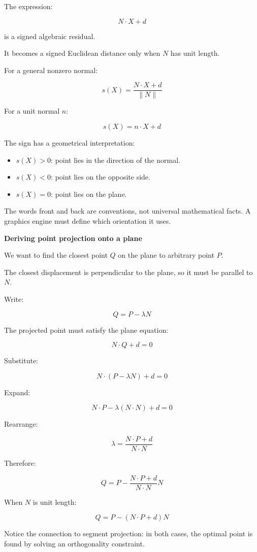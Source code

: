 The expression:

\[
N\cdot X+d
\]

is a signed algebraic residual.

It becomes a signed Euclidean distance only when \(N\) has unit length.

For a general nonzero normal:

\[
\boxed{ s(X)=\frac{N\cdot X+d}{\|N\|} }
\]

For a unit normal \(n\):

\[
\boxed{s(X)=n\cdot X+d}
\]

The sign has a geometrical interpretation:

\begin{itemize}
\tightlist
\item
  \(s(X)>0\): point lies in the direction of the normal.
\item
  \(s(X)<0\): point lies on the opposite side.
\item
  \(s(X)=0\): point lies on the plane.
\end{itemize}

The words front and back are conventions, not universal mathematical facts. A graphics engine must define which orientation it uses.

\textbf{Deriving point projection onto a plane}

We want to find the closest point \(Q\) on the plane to arbitrary point \(P\).

The closest displacement is perpendicular to the plane, so it must be parallel to \(N\).

Write:

\[
Q=P-\lambda N
\]

The projected point must satisfy the plane equation:

\[
N\cdot Q+d=0
\]

Substitute:

\[
N\cdot(P-\lambda N)+d=0
\]

Expand:

\[
N\cdot P-\lambda(N\cdot N)+d=0
\]

Rearrange:

\[
\lambda=\frac{N\cdot P+d}{N\cdot N}
\]

Therefore:

\[
\boxed{ Q=P-\frac{N\cdot P+d}{N\cdot N}N }
\]

When \(N\) is unit length:

\[
\boxed{Q=P-(N\cdot P+d)N}
\]

Notice the connection to segment projection: in both cases, the optimal point is found by solving an orthogonality constraint.

